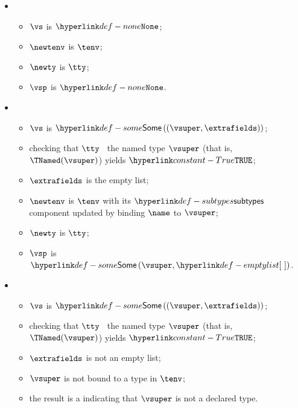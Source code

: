 \ProseParagraph
\OneApplies
\begin{itemize}
  \item {}
  \begin{itemize}
    \item $\vs$ is $\None$;
    \item $\newtenv$ is $\tenv$;
    \item $\newty$ is $\tty$;
    \item $\vsp$ is $\None$.
  \end{itemize}

  \item {}
  \begin{itemize}
    \item $\vs$ is $\some{(\vsuper, \extrafields)}$;
    \item checking that $\tty$ \subtypesatisfiesterm\ the named type $\vsuper$ (that is, \\ $\TNamed(\vsuper)$) yields
          $\True$\ProseOrTypeError;
    \item $\extrafields$ is the empty list;
    \item $\newtenv$ is $\tenv$ with its $\subtypes$ component updated by binding $\name$ to $\vsuper$;
    \item $\newty$ is $\tty$;
    \item $\vsp$ is $\some{\vsuper, \emptylist}$.
  \end{itemize}

  \item {}
  \begin{itemize}
    \item $\vs$ is $\some{(\vsuper, \extrafields)}$;
    \item checking that $\tty$ \subtypesatisfiesterm\ the named type $\vsuper$ (that is, \\ $\TNamed(\vsuper)$) yields
          $\True$\ProseOrTypeError;
    \item $\extrafields$ is not an empty list;
    \item $\vsuper$ is not bound to a type in $\tenv$;
    \item the result is a \typingerrorterm{} indicating that $\vsuper$ is not a declared type.
  \end{itemize}


\end{itemize}
